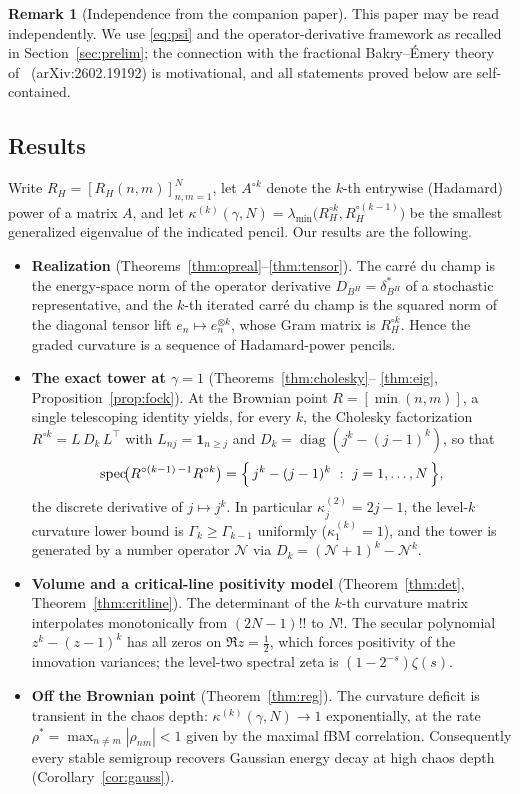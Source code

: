 \documentclass[11pt,reqno]{amsart}
\theoremstyle{plain}
\theoremstyle{definition}
\newtheorem{remark}[theorem]{Remark}
\newcommand{\Had}{\mathbin{\circ}}     %
\newcommand{\Num}{\mathcal{N}}         %
\newcommand{\Bm}{B^{H}}
\DeclareMathOperator{\spec}{spec}
\DeclareMathOperator{\diag}{diag}
\newcommand{\Gam}{\Gamma}
\begin{document}
\begin{remark}[Independence from the companion paper]
This paper may be read independently. We use \eqref{eq:psi} and the
operator-derivative framework as recalled in Section~\ref{sec:prelim}; the
connection with the fractional Bakry--\'Emery theory of~\cite{FontesPartI}
(arXiv:2602.19192) is motivational, and all statements proved below are
self-contained.
\end{remark}

\subsection*{Results}
Write $R_H=[R_H(n,m)]_{n,m=1}^{N}$, let $A^{\Had k}$ denote the $k$-th entrywise
(Hadamard) power of a matrix $A$, and let
$\kappa^{(k)}(\gamma,N)=\lambda_{\min}\!\bigl(R_H^{\Had k},R_H^{\Had(k-1)}\bigr)$
be the smallest generalized eigenvalue of the indicated pencil. Our results are
the following.

\begin{itemize}[leftmargin=1.4em]
\item \textbf{Realization} (Theorems~\ref{thm:opreal}--\ref{thm:tensor}). The
carr\'e du champ is the energy-space norm of the operator derivative
$D_{\Bm}=\delta_{\Bm}^{*}$ of a stochastic representative, and the $k$-th iterated
carr\'e du champ is the squared norm of the diagonal tensor lift
$e_n\mapsto e_n^{\otimes k}$, whose Gram matrix is $R_H^{\Had k}$. Hence the
graded curvature is a sequence of Hadamard-power pencils.

\item \textbf{The exact tower at $\gamma=1$} (Theorems~\ref{thm:cholesky}--%
\ref{thm:eig}, Proposition~\ref{prop:fock}). At the Brownian point
$R=[\min(n,m)]$, a single telescoping identity yields, for every $k$, the
Cholesky factorization $R^{\Had k}=L\,D_k\,L^{\top}$ with $L_{nj}=\mathbf 1_{n\ge j}$
and $D_k=\diag(j^{k}-(j-1)^{k})$, so that
\[
  \spec\!\bigl(R^{\Had(k-1)\,-1}R^{\Had k}\bigr)
  =\Bigl\{\,j^{k}-(j-1)^{k}\ :\ j=1,\dots,N\,\Bigr\},
\]
the discrete derivative of $j\mapsto j^{k}$. In particular $\kappa^{(2)}_j=2j-1$,
the level-$k$ curvature lower bound is $\Gam_k\ge\Gam_{k-1}$ uniformly
($\kappa^{(k)}_1=1$), and the tower is generated by a number operator
$\Num$ via $D_k=(\Num+1)^{k}-\Num^{k}$.

\item \textbf{Volume and a critical-line positivity model}
(Theorem~\ref{thm:det}, Theorem~\ref{thm:critline}). The determinant of the
$k$-th curvature matrix interpolates monotonically from $(2N-1)!!$ to $N!$. The
secular polynomial $z^{k}-(z-1)^{k}$ has all zeros on $\Re z=\tfrac12$, which
forces positivity of the innovation variances; the level-two spectral zeta is
$(1-2^{-s})\zeta(s)$.

\item \textbf{Off the Brownian point} (Theorem~\ref{thm:reg}). The curvature
deficit is transient in the chaos depth: $\kappa^{(k)}(\gamma,N)\to1$
exponentially, at the rate $\rho^{*}=\max_{n\neq m}|\rho_{nm}|<1$ given by the
maximal fBM correlation. Consequently every stable semigroup recovers Gaussian
energy decay at high chaos depth (Corollary~\ref{cor:gauss}).
\end{itemize}
\end{document}
